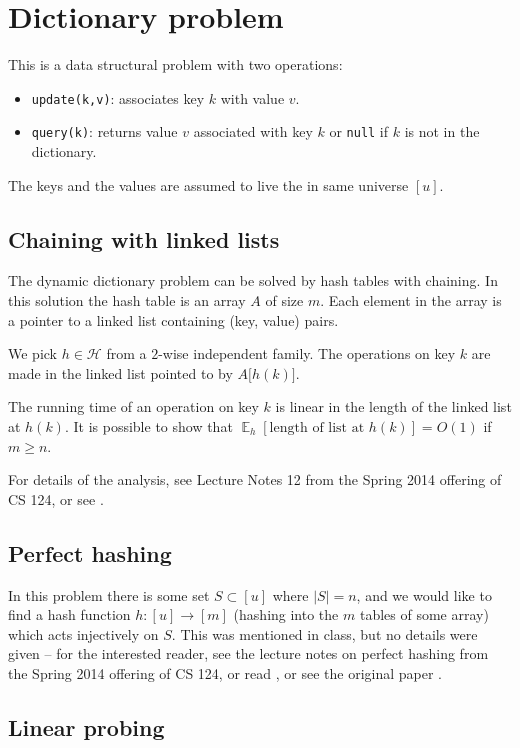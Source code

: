 \documentclass[11pt]{article}
\DeclareMathOperator*{\E}{\mathbb{E}}
\renewcommand{\H}{\mathcal{H}}
\theoremstyle{definition}
\begin{document}
\section{Dictionary problem}

This is a data structural problem with two operations:
\begin{itemize}
    \item \texttt{update(k,v)}: associates key $k$ with value $v$.
    \item \texttt{query(k)}: returns value $v$ associated with key $k$ or
        \texttt{null} if $k$ is not in the dictionary.
\end{itemize}
The keys and the values are assumed to live the in same universe $[u]$.

\subsection{Chaining with linked lists}
The dynamic dictionary problem can be solved by hash tables with chaining. In
this solution the hash table is an array $A$ of size $m$. Each element in the
array is a pointer to a linked list containing (key, value) pairs.

We pick $h\in\H$ from a $2$-wise independent family. The operations on key $k$
are made in the linked list pointed to by $A\big[h(k)\big]$.

The running time of an operation on key $k$ is linear in the length of the
linked list at $h(k)$. It is possible to show that $\E_h[\text{length of list
at $h(k)$}]= O(1)$ if $m\geq n$.

For details of the analysis, see Lecture Notes 12 from the Spring 2014 offering of CS 124, or see \cite[Section 11.2]{CLRS}.

\subsection{Perfect hashing}

In this problem there is some set $S\subset[u]$ where $|S| = n$, and we would like to find a hash function $h:[u]\rightarrow[m]$ (hashing into the $m$ tables of some array) which acts injectively on $S$. This was mentioned in class, but no details were given -- for the interested reader, see the lecture notes on perfect hashing from the Spring 2014 offering of CS 124, or read \cite[Section 11.5]{CLRS}, or see the original paper \cite{FKS84}.

\subsection{Linear probing}
\end{document}
